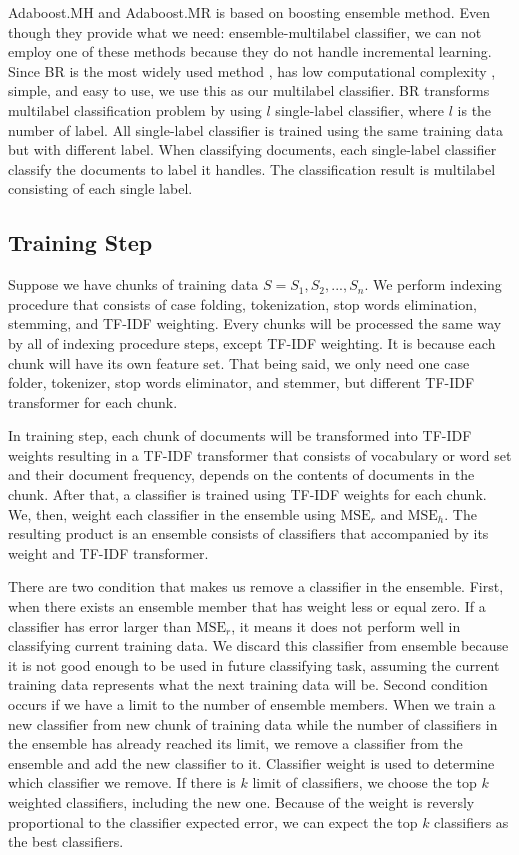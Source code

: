 \documentclass[conference]{IEEEtran}
\begin{document}
Adaboost.MH and Adaboost.MR is based on boosting ensemble method.
Even though they provide what we need: ensemble-multilabel classifier, we can not employ one of these methods because they do not handle incremental learning.
Since BR is the most widely used method \cite{santos}, has low computational complexity \cite{cherman}, simple, and easy to use, we use this as our multilabel classifier.
BR transforms multilabel classification problem by using $l$ single-label classifier, where $l$ is the number of label.
All single-label classifier is trained using the same training data but with different label.
When classifying documents, each single-label classifier classify the documents to label it handles.
The classification result is multilabel consisting of each single label.

\subsection{Training Step}

Suppose we have chunks of training data $S = {S_1, S_2, ..., S_n}$.
We perform indexing procedure that consists of case folding, tokenization, stop words elimination, stemming, and TF-IDF weighting.
Every chunks will be processed the same way by all of indexing procedure steps, except TF-IDF weighting.
It is because each chunk will have its own feature set.
That being said, we only need one case folder, tokenizer, stop words eliminator, and stemmer, but different TF-IDF transformer for each chunk.

In training step, each chunk of documents will be transformed into TF-IDF weights resulting in a TF-IDF transformer that consists of vocabulary or word set and their document frequency, depends on the contents of documents in the chunk.
After that, a classifier is trained using TF-IDF weights for each chunk.
We, then, weight each classifier in the ensemble using $\text{MSE}_r$ and $\text{MSE}_h$.
The resulting product is an ensemble consists of classifiers that accompanied by its weight and TF-IDF transformer.

There are two condition that makes us remove a classifier in the ensemble.
First, when there exists an ensemble member that has weight less or equal zero.
If a classifier has error larger than $\text{MSE}_r$, it means it does not perform well in classifying current training data.
We discard this classifier from ensemble because it is not good enough to be used in future classifying task, assuming the current training data represents what the next training data will be.
Second condition occurs if we have a limit to the number of ensemble members.
When we train a new classifier from new chunk of training data while the number of classifiers in the ensemble has already reached its limit, we remove a classifier from the ensemble and add the new classifier to it.
Classifier weight is used to determine which classifier we remove.
If there is $k$ limit of classifiers, we choose the top $k$ weighted classifiers, including the new one.
Because of the weight is reversly proportional to the classifier expected error, we can expect the top $k$ classifiers as the best classifiers.
\end{document}
